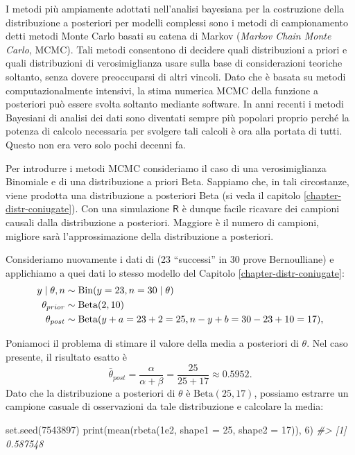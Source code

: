\documentclass[
  10pt,
  italian,
  a4paper,
  extrafontsizes,onecolumn,openright
  ]{memoir}
\newenvironment{Shaded}{\begin{snugshade}}{\end{snugshade}}
\newcommand{\AttributeTok}[1]{\textcolor[rgb]{0.77,0.63,0.00}{#1}}
\newcommand{\CommentTok}[1]{\textcolor[rgb]{0.56,0.35,0.01}{\textit{#1}}}
\newcommand{\DecValTok}[1]{\textcolor[rgb]{0.00,0.00,0.81}{#1}}
\newcommand{\FloatTok}[1]{\textcolor[rgb]{0.00,0.00,0.81}{#1}}
\newcommand{\FunctionTok}[1]{\textcolor[rgb]{0.00,0.00,0.00}{#1}}
\newcommand{\NormalTok}[1]{#1}
\DeclareMathOperator{\Bin}{Bin} %
\newcommand{\R}{\textsf{R}} %
\begin{document}
I metodi più ampiamente adottati nell'analisi bayesiana per la costruzione della distribuzione a posteriori per modelli complessi sono i metodi di campionamento detti metodi Monte Carlo basati su catena di Markov (\emph{Markov Chain Monte Carlo}, MCMC). Tali metodi consentono di decidere quali distribuzioni a priori e quali distribuzioni di verosimiglianza usare sulla base di considerazioni teoriche soltanto, senza dovere preoccuparsi di altri vincoli. Dato che è basata su metodi computazionalmente intensivi, la stima numerica MCMC della funzione a posteriori può essere svolta soltanto mediante software. In anni recenti i metodi Bayesiani di analisi dei dati sono diventati sempre più popolari proprio perché la potenza di calcolo necessaria per svolgere tali calcoli è ora alla portata di tutti. Questo non era vero solo pochi decenni fa.

Per introdurre i metodi MCMC consideriamo il caso di una verosimiglianza Binomiale e di una distribuzione a priori Beta. Sappiamo che, in tali circostanze, viene prodotta una distribuzione a posteriori Beta (si veda il capitolo \ref{chapter-distr-coniugate}). Con una simulazione \(\R\) è dunque facile ricavare dei campioni causali dalla distribuzione a posteriori. Maggiore è il numero di campioni, migliore sarà l'approssimazione della distribuzione a posteriori.

Consideriamo nuovamente i dati di \textcite{zetschefuture2019} (23 ``successi'' in 30 prove Bernoulliane) e applichiamo a quei dati lo stesso modello del Capitolo \ref{chapter-distr-coniugate}:
\begin{align}
y \mid \theta, n &\sim \Bin(y = 23, n = 30 \mid \theta) \notag\\
\theta_{prior} &\sim \mbox{Beta}(2, 10) \notag\\
\theta_{post}  &\sim \mbox{Beta}(y + a = 23 + 2 = 25, n - y + b = 30 - 23 + 10 = 17), \notag
\end{align}

\noindent
Poniamoci il problema di stimare il valore della media a posteriori di \(\theta\).
Nel caso presente, il risultato esatto è
\[
\bar{\theta}_{post} = \frac{\alpha}{\alpha + \beta} = \frac{25}{25 + 17} \approx 0.5952.
\]
Dato che la distribuzione a posteriori di \(\theta\) è \(\mbox{Beta}(25, 17)\), possiamo estrarre un campione casuale di osservazioni da tale distribuzione e calcolare la media:

\begin{Shaded}
\begin{Highlighting}[]
\FunctionTok{set.seed}\NormalTok{(}\DecValTok{7543897}\NormalTok{)}
\FunctionTok{print}\NormalTok{(}\FunctionTok{mean}\NormalTok{(}\FunctionTok{rbeta}\NormalTok{(}\FloatTok{1e2}\NormalTok{, }\AttributeTok{shape1 =} \DecValTok{25}\NormalTok{, }\AttributeTok{shape2 =} \DecValTok{17}\NormalTok{)), }\DecValTok{6}\NormalTok{)}
\CommentTok{\#\textgreater{} [1] 0.587548}
\end{Highlighting}
\end{Shaded}
\end{document}
